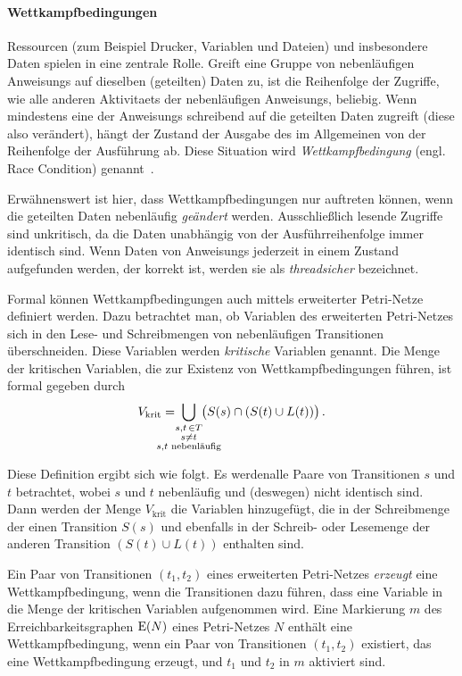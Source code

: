 \paragraph{Wettkampfbedingungen}
Ressourcen (zum Beispiel Drucker, Variablen und Dateien) und insbesondere Daten spielen in  eine zentrale Rolle. Greift eine Gruppe von nebenläufigen \glspl{Anweisung} auf dieselben (geteilten) Daten zu, ist die Reihenfolge der Zugriffe, wie alle anderen \glspl{Aktivitaet} der nebenläufigen \glspl{Anweisung}, beliebig. Wenn mindestens eine der \glspl{Anweisung} schreibend auf die geteilten Daten zugreift (diese also verändert), hängt der Zustand der Ausgabe des  im Allgemeinen von der Reihenfolge der Ausführung ab. Diese Situation wird \emph{Wettkampfbedingung} (engl. Race Condition) genannt~\cite{Hettel2016}. 

Erwähnenswert ist hier, dass Wettkampfbedingungen nur auftreten können, wenn die geteilten Daten nebenläufig \emph{geändert} werden. Ausschließlich lesende Zugriffe sind unkritisch, da die Daten unabhängig von der Ausführreihenfolge immer identisch sind. Wenn Daten von \glspl{Anweisung} jederzeit in einem Zustand aufgefunden werden, der korrekt ist, werden sie als \emph{threadsicher} bezeichnet.

Formal können Wettkampfbedingungen auch mittels erweiterter Petri-Netze definiert werden. Dazu betrachtet man, ob Variablen des erweiterten Petri-Netzes sich in den Lese- und Schreibmengen von nebenläufigen Transitionen überschneiden. Diese Variablen werden \emph{kritische} Variablen genannt. Die Menge der kritischen Variablen, die zur Existenz von Wettkampfbedingungen führen, ist formal gegeben durch
\begin{align*}
	V_\text{krit} = \;\bigcup_{\mathclap{\substack{s,t\, \in T\\s \neq t\\s, t \text{ nebenläufig}}}} \;\left( \strut{S(s) \cap (S(t) \cup L(t))}\right).
\end{align*}

Diese Definition ergibt sich wie folgt. Es werdenalle Paare von Transitionen $s$ und $t$ betrachtet, wobei $s$ und $t$ nebenläufig und (deswegen) nicht identisch sind. Dann werden der Menge $V_\text{krit}$ die Variablen hinzugefügt, die in der Schreibmenge der einen Transition $S(s)$ und ebenfalls in der Schreib- oder Lesemenge der anderen Transition $(S(t) \cup L(t))$ enthalten sind.

Ein Paar von Transitionen $(t_1, t_2)$ eines erweiterten Petri-Netzes \emph{erzeugt} eine Wettkampfbedingung, wenn die Transitionen dazu führen, dass eine Variable in die Menge der kritischen Variablen aufgenommen wird. Eine Markierung $m$ des Erreichbarkeitsgraphen $\operatorname{E}(N)$ eines Petri-Netzes $N$ enthält eine Wettkampfbedingung, wenn ein Paar von Transitionen $(t_1, t_2)$ existiert, das eine Wettkampfbedingung erzeugt, und $t_1$ und $t_2$ in $m$ aktiviert sind.


